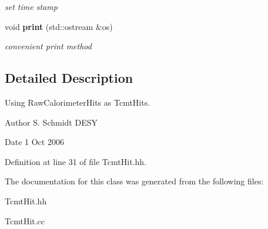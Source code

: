 \begin{DoxyCompactItemize}
\begin{DoxyCompactList}\small\item\em set time stamp \item\end{DoxyCompactList}\item 
void {\bf print} (std::ostream \&os)\label{classCALICE_1_1TcmtHit_a98d3bd8b59170986e7c5126eed9f11a9}

\begin{DoxyCompactList}\small\item\em convenient print method \item\end{DoxyCompactList}\end{DoxyCompactItemize}


\subsection{Detailed Description}
Using RawCalorimeterHits as TcmtHits. \begin{DoxyAuthor}{Author}
S. Schmidt DESY 
\end{DoxyAuthor}
\begin{DoxyDate}{Date}
1 Oct 2006 
\end{DoxyDate}


Definition at line 31 of file TcmtHit.hh.

The documentation for this class was generated from the following files:\begin{DoxyCompactItemize}
\item 
TcmtHit.hh\item 
TcmtHit.cc\end{DoxyCompactItemize}
